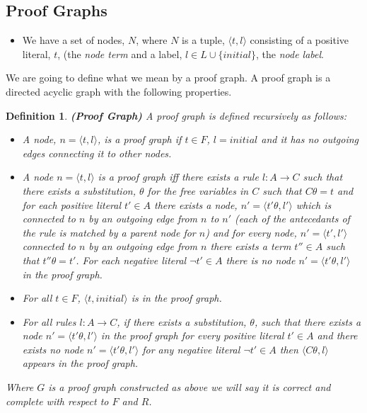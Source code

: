 \documentclass{blue-book}
\newtheorem{definition}{Definition}
\newcommand{\drule}[3]{\ensuremath{#1:#2 \rightarrow #3}}
\begin{document}
\subsection{Proof Graphs}

\begin{itemize}
\item We have a set of nodes, $N$, where $N$ is a tuple, $\langle t, l\rangle$ consisting of a positive literal, $t$, (the \emph{node term} and a label, $l \in L \cup \{initial\}$, the \emph{node label}.
\end{itemize}

We are going to define what we mean by a proof graph.  A proof graph is a directed acyclic graph with the following properties.

\begin{definition}{\bf (Proof Graph)}
A \emph{proof graph} is defined recursively as follows:

\begin{itemize}
\item A node, $n = \langle t, l\rangle$, is a proof graph if $t \in F$, $l = initial$ and it has no outgoing edges connecting it to other nodes.
\item A node $n = \langle t, l\rangle$ is a proof graph iff there exists a rule $\drule{l}{A}{C}$ such that there exists a substitution, $\theta$ for the free variables in $C$ such that $C\theta = t$ and for each positive literal $t' \in A$ there exists a node, $n' = \langle t'\theta, l'\rangle$ which is connected to $n$ by an outgoing edge from $n$ to $n'$ (each of the antecedants of the rule is matched by a parent node for $n$) and for every node, $n' = \langle t', l'\rangle$ connected to $n$ by an outgoing edge from $n$ there exists a term $t'' \in A$ such that $t''\theta = t'$.  For each negative literal $\neg t' \in A$ there is no node $n' = \langle t'\theta, l'\rangle$ in the proof graph.
\item For all $t \in F$, $\langle t, initial \rangle$ is in the proof graph.
\item For all rules $\drule{l}{A}{C}$, if there exists a substitution, $\theta$, such that there exists a node $n' = \langle t'\theta, l'\rangle$ in the proof graph for every positive literal $t' \in A$ and there exists no node  $n' = \langle t'\theta, l'\rangle$ for any negative literal $\neg t' \in A$ then $\langle C\theta, l\rangle$ appears in the proof graph.
\end{itemize}

Where $G$ is a proof graph constructed as above we will say it is \emph{correct and complete with respect to $F$ and $R$}.  
\end{definition}
\end{document}
